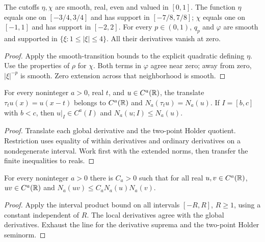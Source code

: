 \begin{lemma}
  \label{lem:c12_cutoffs}
  The cutoffs $\eta,\chi$ are smooth, real, even and valued in $[0,1]$.
  The function $\eta$ equals one on $[-3/4,3/4]$ and has support in $[-7/8,7/8]$;
  $\chi$ equals one on $[-1,1]$ and has support in $[-2,2]$.
  For every $p\in(0,1)$, $q_p$ and $\varphi$ are smooth and supported in
  $\{\xi:1\le|\xi|\le4\}$. All their derivatives vanish at zero.
\end{lemma}
\begin{proof}
  Apply the smooth-transition bounds to the explicit quadratic defining $\eta$.
  Use the properties of $\rho$ for $\chi$. Both terms in $\varphi$ agree near zero;
  away from zero, $|\xi|^{-p}$ is smooth. Zero extension across that neighborhood is smooth.
\end{proof}

\begin{lemma}
  \label{lem:c12_holder_translation}
  For every noninteger $a>0$, real $t$, and $u\in C^a(\mathbb{R})$, the translate
  $\tau_tu(x)=u(x-t)$ belongs to $C^a(\mathbb{R})$ and $N_a(\tau_tu)=N_a(u)$.
  If $I=[b,c]$ with $b<c$, then $u|_I\in C^a(I)$ and $N_a(u;I)\le N_a(u)$.
\end{lemma}
\begin{proof}
  Translate each global derivative and the two-point Holder quotient.
  Restriction uses equality of within derivatives and ordinary derivatives on a nondegenerate
  interval. Work first with the extended norms, then transfer the finite inequalities to reals.
\end{proof}

\begin{lemma}
  \label{lem:c12_holder_product}
  For every noninteger $a>0$ there is $C_a>0$ such that for all real
  $u,v\in C^a(\mathbb{R})$, $uv\in C^a(\mathbb{R})$ and $N_a(uv)\le C_aN_a(u)N_a(v)$.
\end{lemma}
\begin{proof}
  Apply the interval product bound on all intervals $[-R,R]$, $R\ge1$,
  using a constant independent of $R$. The local derivatives agree with the global derivatives.
  Exhaust the line for the derivative suprema and the two-point Holder seminorm.
\end{proof}

